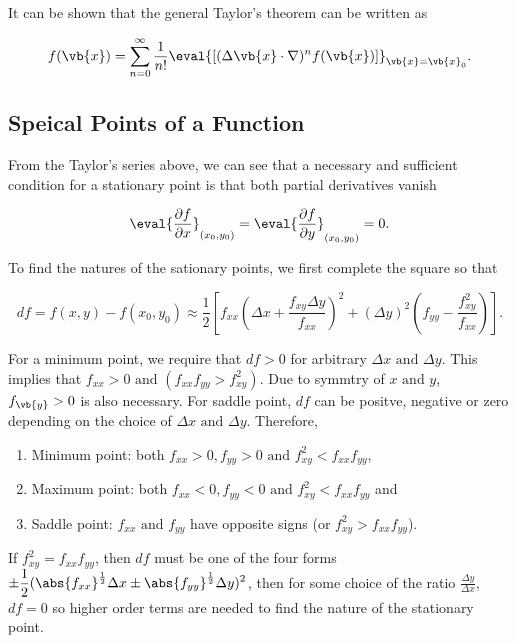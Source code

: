 \documentclass[english,a4paper,12pt]{report}
\begin{document}
It can be shown that the general Taylor's theorem can be written as 

\begin{equation}
    f(\vb{x} ) = \sum_{n=0}^{\infty} \frac{1}{n!} \eval{\left[ (\Delta \vb{x} \cdot \nabla )^{n} f(\vb{x} ) \right]}_{\vb{x} = \vb{x} _{0}}  .
\end{equation}

\subsection{Speical Points of a Function}

From the Taylor's series above, we can see that a necessary and sufficient condition for a stationary point is that both partial derivatives vanish

\begin{equation}
    \eval{\frac{\partial f}{\partial x}}_{(x_0 ,y_0 )} = \eval{\frac{\partial f}{\partial y}}_{(x_0 ,y_0 )} =0.
\end{equation}

To find the natures of the sationary points, we first complete the square so that 

\begin{equation}
    df = f(x,y) - f(x_0 , y_0 ) \approx  \frac{1}{2} \left[ f_{xx}\left( \Delta x+ \frac{f_{xy}\Delta y }{f_{xx} }  \right)^2 + (\Delta y)^2\left( f_{yy} - \frac{f_{xy}^2 }{f_{xx} }   \right)  \right].
\end{equation}

For a minimum point, we require that \(df>0\) for arbitrary \(\Delta x \text { and } \Delta y\). This implies that \(f_{xx} >0 \text { and } \left( f_{xx}f_{yy} > f_{xy}^2 \right)\). Due to symmtry of \(x \text { and } y\), \(f_{\vb{y} } >0\) is also necessary. For saddle point, \(df\) can be positve, negative or zero depending on the choice of \(\Delta x \text { and } \Delta y\). Therefore,

\begin{enumerate}
    \item Minimum point: both \(f_{xx} > 0, f_{yy} > 0 \text { and } f_{xy}^2 < f_{xx}f_{yy}\),
    \item Maximum point: both \(f_{xx} < 0, f_{yy} < 0 \text { and } f_{xy}^2 < f_{xx}f_{yy}\) and
    \item Saddle point: \(f_{xx} \text { and } f_{yy}\) have opposite signs (or \(f_{xy}^2 > f_{xx}f_{yy}\)). 
\end{enumerate}

If \(f_{xy}^2 = f_{xx}f_{yy}\), then \(df\) must be one of the four forms \(\displaystyle \pm \frac{1}{2} (\abs{f_{xx} }^{\frac{1}{2} } \Delta x \pm \abs{f_{yy} }^{\frac{1}{2} }\Delta y)^2\), then for some choice of the ratio \(\displaystyle \frac{\Delta y}{\Delta x}\), \(df = 0\) so higher order terms are needed to find the nature of the stationary point. 
\end{document}
